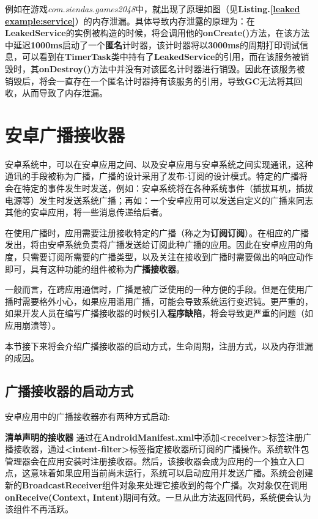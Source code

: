 例如在游戏\emph{com.siendas.games2048}中，就出现了原理如图（见\textbf{Listing.\textcolor{red}{\ref{leaked example:service}}}）的内存泄漏。具体导致内存泄露的原理为：在\textbf{LeakedService}的实例被构造的时候，将会调用他的\textbf{onCreate()}方法，在该方法中延迟\textbf{1000ms}启动了一个\textbf{匿名}计时器，该计时器将以\textbf{3000ms}的周期打印调试信息，可以看到在\textbf{TimerTask}类中持有了\textbf{LeakedService}的引用，而在该服务被销毁时，其\textbf{onDestroy()}方法中并没有对该匿名计时器进行销毁。因此在该服务被销毁后，将会一直存在一个匿名计时器持有该服务的引用，导致\textbf{GC}无法将其回收，从而导致了内存泄漏。

\section{安卓广播接收器}

安卓系统中，可以在安卓应用之间、以及安卓应用与安卓系统之间实现通讯，这种通讯的手段被称为广播\cite{androidbroadcastsguide}，广播的设计采用了发布-订阅的设计模式。特定的广播将会在特定的事件发生时发送，例如：安卓系统将在各种系统事件（插拔耳机，插拔电源等）发生时发送系统广播；再如：一个安卓应用可以发送自定义的广播来同志其他的安卓应用，将一些消息传递给后者。

在使用广播时，应用需要注册接收特定的广播（称之为\textbf{订阅订阅}）。在相应的广播发出，将由安卓系统负责将广播发送给订阅此种广播的应用。因此在安卓应用的角度，只需要订阅所需要的广播类型，以及关注在接收到广播时需要做出的响应动作即可，具有这种功能的组件被称为\textbf{广播接收器}。
	
一般而言，在跨应用通信时，广播是被广泛使用的一种方便的手段。但是在使用广播时需要格外小心，如果应用滥用广播，可能会导致系统运行变迟钝。更严重的，如果开发人员在编写广播接收器的时候引入\textbf{程序缺陷}，将会导致更严重的问题（如应用崩溃等）。

本节接下来将会介绍广播接收器的启动方式，生命周期，注册方式，以及内存泄漏的成因。

\subsection{广播接收器的启动方式}
安卓应用中的广播接收器亦有两种方式启动\cite{broadcast}:

\textbf{清单声明的接收器 }\label{declaration:receiver in manifest} 通过在\textbf{AndroidManifest.xml}中添加\textbf{<receiver>}标签注册广播接收器，通过\textbf{<intent-filter>}标签指定接收器所订阅的广播操作。系统软件包管理器会在应用安装时注册接收器。然后，该接收器会成为应用的一个独立入口点，这意味着如果应用当前尚未运行，系统可以启动应用并发送广播。系统会创建新的\textbf{BroadcastReceiver}组件对象来处理它接收到的每个广播。次对象仅在调用\textbf{onReceive(Context, Intent)}期间有效。一旦从此方法返回代码，系统便会认为该组件不再活跃。

